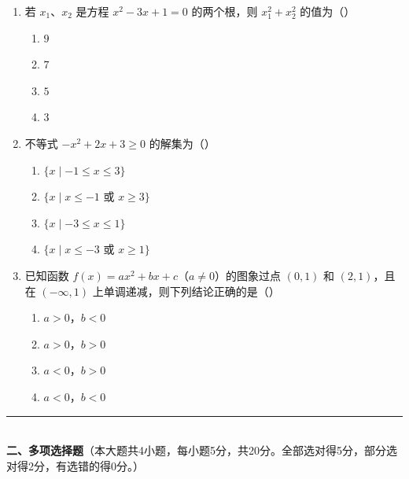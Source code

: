 \documentclass[12pt, a4paper]{ctexart}
\begin{document}
\begin{enumerate}
\item 若 $x_1$、$x_2$ 是方程 $x^2-3x+1=0$ 的两个根，则 $x_1^2+x_2^2$ 的值为（\quad）
  \begin{enumerate}[label=\Alph*., itemsep=0pt]
    \item $9$ \quad \item $7$ \quad \item $5$ \quad \item $3$
  \end{enumerate}

\item 不等式 $-x^2+2x+3\geq 0$ 的解集为（\quad）
  \begin{enumerate}[label=\Alph*., itemsep=0pt]
    \item $\{x\mid -1\leq x\leq 3\}$ \quad \item $\{x\mid x\leq -1 \text{ 或 } x\geq 3\}$
    \item $\{x\mid -3\leq x\leq 1\}$ \quad \item $\{x\mid x\leq -3 \text{ 或 } x\geq 1\}$
  \end{enumerate}

\item 已知函数 $f(x)=ax^2+bx+c$（$a\neq 0$）的图象过点 $(0,1)$ 和 $(2,1)$，且在 $(-\infty,1)$ 上单调递减，则下列结论正确的是（\quad）
  \begin{enumerate}[label=\Alph*., itemsep=0pt]
    \item $a>0$，$b<0$ \quad \item $a>0$，$b>0$
    \item $a<0$，$b>0$ \quad \item $a<0$，$b<0$
  \end{enumerate}
\end{enumerate}

\vspace{6pt}

\noindent\rule{\textwidth}{0.4pt}\\[2pt]
{\large\bfseries 二、多项选择题}（本大题共4小题，每小题5分，共20分。全部选对得5分，部分选对得2分，有选错的得0分。）

\vspace{6pt}
\end{document}
